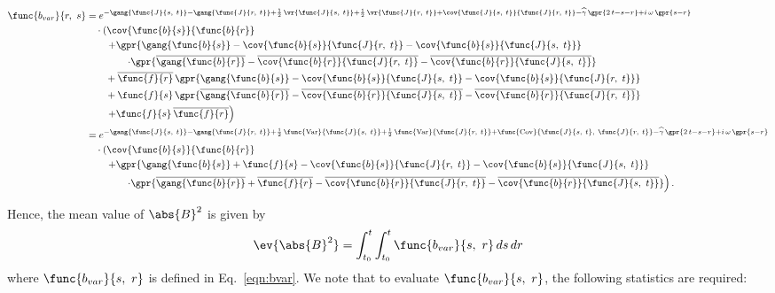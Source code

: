 \begin{align}
    \func{b_{var}}{r,\ s} &= e^{-\gang{\func{J}{s,\ t}} - \gang{\func{J}{r,\ t}} + \frac{1}{2}\,\vr{\func{J}{s,\ t}} + \frac{1}{2}\,\vr{\func{J}{r,\ t}} + \cov{\func{J}{s,\ t}}{\func{J}{r,\ t}} - \widehat{\gamma}\,\gpr{2\,t - s - r} + i\,\omega\,\gpr{s - r}} \nonumber \\
    		&\quad \cdot \left( \cov{\func{b}{s}}{\func{b}{r}} \right. \nonumber \\
    		&\qquad \left. + \gpr{\gang{\func{b}{s}} - \cov{\func{b}{s}}{\func{J}{r,\ t}} - \cov{\func{b}{s}}{\func{J}{s,\ t}}} \right. \nonumber \\
    		&\qquad\qquad \left. \cdot \gpr{\overline{\gang{\func{b}{r}}} - \overline{\cov{\func{b}{r}}{\func{J}{r,\ t}}} - \overline{\cov{\func{b}{r}}{\func{J}{s,\ t}}}} \right. \nonumber \\
    		&\qquad + \overline{\func{f}{r}}\,\gpr{\gang{\func{b}{s}} - \cov{\func{b}{s}}{\func{J}{s,\ t}} - \cov{\func{b}{s}}{\func{J}{r,\ t}}} \nonumber \\
    		&\qquad + \func{f}{s}\,\gpr{\overline{\gang{\func{b}{r}}} - \overline{\cov{\func{b}{r}}{\func{J}{s,\ t}}} - \overline{\cov{\func{b}{r}}{\func{J}{r,\ t}}}} \nonumber \\
    		&\qquad \left. + \func{f}{s}\,\overline{\func{f}{r}} \right) \nonumber \\
    	&= e^{-\gang{\func{J}{s,\ t}} - \gang{\func{J}{r,\ t}} + \frac{1}{2}\,\func{\text{Var}}{\func{J}{s,\ t}} + \frac{1}{2}\,\func{\text{Var}}{\func{J}{r,\ t}} + \func{\text{Cov}}{\func{J}{s,\ t},\ \func{J}{r,\ t}} - \widehat{\gamma}\,\gpr{2\,t - s - r} + i\,\omega\,\gpr{s - r}} \nonumber \\
    		&\quad \cdot \left(\cov{\func{b}{s}}{\func{b}{r}} \right. \nonumber \\
    		&\qquad \left. + \gpr{\gang{\func{b}{s}} + \func{f}{s} - \cov{\func{b}{s}}{\func{J}{r,\ t}} - \cov{\func{b}{s}}{\func{J}{s,\ t}}}\right. \nonumber \\
    		&\qquad\qquad \left. \cdot \gpr{\overline{\gang{\func{b}{r}}} + \overline{\func{f}{r}} - \overline{\cov{\func{b}{r}}{\func{J}{r,\ t}}} - \overline{\cov{\func{b}{r}}{\func{J}{s,\ t}}}} \right). \label{eqn:bvar}
\end{align}

Hence, the mean value of $\abs{B}^2$ is given by 
\begin{equation}
	\ev{\abs{B}^2} = \int_{t_0}^{t} \int_{t_0}^{t} \func{b_{var}}{s,\ r}\,ds\,dr
	\label{eqn:mean_absB2}
\end{equation}
where $\func{b_{var}}{s,\ r}$ is defined in Eq.~\ref{eqn:bvar}. We note that to evaluate $\func{b_{var}}{s,\ r}$, the following statistics are required:

